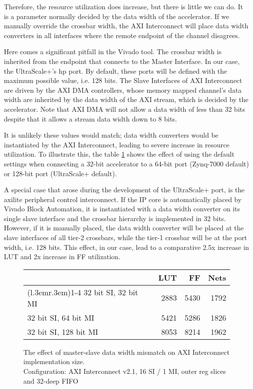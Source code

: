 Therefore, the resource utilization does increase, but there is little we can do.
It is a parameter normally decided by the data width of the accelerator.
If we manually override the crossbar width, the AXI Interconnect will place
data width converters in all interfaces where the remote endpoint of the channel disagrees.

Here comes a significant pitfall in the Vivado tool. The crossbar width is inherited
from the endpoint that connects to the Master Interface. In our case, the UltraScale+'s \gls{hp} port.
By default, these ports will be defined with the maximum possible value, i.e. 128 bits.
The Slave Interfaces of AXI Interconnect are driven by the AXI DMA controllers,
whose memory mapped channel's data width are inherited by the data width of the AXI stream,
which is decided by the accelerator. Note that AXI DMA will not allow a data width of less
than 32 bits despite that it allows a stream data width down to 8 bits.

It is unlikely these values would match; data width converters would be instantiated by
the AXI Interconnect, leading to severe increase in resource utilization.
To illustrate this, the table \ref{tab:int-dw} shows the effect of using the default
settings when connecting a 32-bit accelerator to a 64-bit port (Zynq-7000 default)
or 128-bit port (UltraScale+ default).

A special case that arose during the development of the UltraScale+ port,
is the \gls{axilite} peripheral control interconnect. 
If the IP core is automatically placed by Vivado Block Automation,
it is instantiated with a data width converter on its single slave interface
and the crossbar hierarchy is implemented in 32 bits.
However, if it is manually placed, the data width converter will be placed
at the slave interfaces of all tier-2 crossbars, while the tier-1 crossbar will be
at the port width, i.e. 128 bits. 
This effect, in our case, lead to a comparative 2.5x increase in LUT and 2x increase in FF utilization.


\begin{figure}[ht!]
\centering
\begin{tabular}{lrrr}
\toprule
			& LUT	& FF	& Nets \\
\cmidrule(l{.3em}r{.3em}){1-4}
32 bit SI, 32 bit MI	& 2883 & 5430 & 1792 \\
32 bit SI, 64 bit MI	& 5421	&5286	&1826	\\
32 bit SI, 128 bit MI	& 8053	&8214	&1962	\\
\bottomrule
\end{tabular}
\caption{The effect of master-slave data width mismatch on AXI Interconnect implementation size.\\
	Configuration: AXI Interconnect v2.1, 16 SI / 1 MI, outer reg slices and 32-deep FIFO}
\label{tab:int-dw}
\end{figure}

